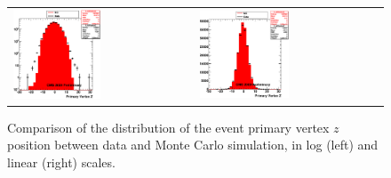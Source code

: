 \begin{figure}[h]
 \centering
 \begin{tabular}{ll}
\includegraphics[width=0.5\textwidth]{plots_EventSelection/h_AllVertexZ_log.eps}&
\includegraphics[width=0.5\textwidth]{plots_EventSelection/h_AllVertexZ_linear.eps}\\
 \end{tabular}
\caption{Comparison of the distribution of the event primary vertex $z$
  position between data and Monte Carlo simulation, in log (left) and
  linear (right) scales.}
\label{fig:vertex_selection_1}
\end{figure}

